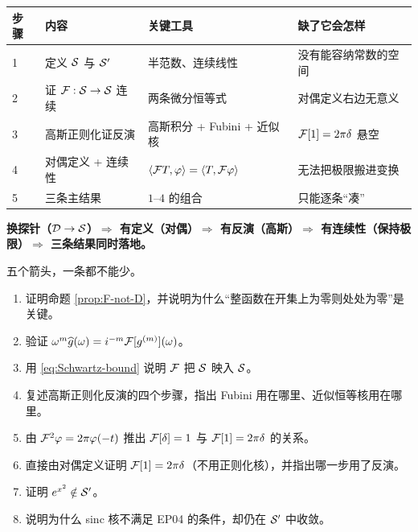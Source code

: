 \begin{center}
\small
\renewcommand{\arraystretch}{1.42}
\begin{tabularx}{\textwidth}{@{}L{1.0cm}L{4.6cm}L{4.4cm}Y@{}}
\toprule
步骤 & 内容 & 关键工具 & 缺了它会怎样 \\
 & 定义 $\mathcal{S}$ 与 $\mathcal{S}'$ & 半范数、连续线性 & 没有能容纳常数的空间 \\
2 & 证 $\mathcal{F}:\mathcal{S}\to\mathcal{S}$ 连续 & 两条微分恒等式 & 对偶定义右边无意义 \\
3 & 高斯正则化证反演 & 高斯积分 + Fubini + 近似核 & $\mathcal{F}[1]=2\pi\delta$ 悬空 \\
4 & 对偶定义 + 连续性 & $\langle \mathcal{F} T,\varphi\rangle=\langle T,\mathcal{F}\varphi\rangle$ & 无法把极限搬进变换 \\
5 & 三条主结果 & $1$--$4$ 的组合 & 只能逐条“凑” \\
\bottomrule
\end{tabularx}
\end{center}

\begin{notebox}[一句话总结这一集的技术路线]
\textbf{换探针（$\mathcal{D}\to\mathcal{S}$）$\Rightarrow$ 有定义（对偶）$\Rightarrow$ 有反演（高斯）$\Rightarrow$ 有连续性（保持极限）$\Rightarrow$ 三条结果同时落地。}

五个箭头，一条都不能少。
\end{notebox}

\begin{quizbox}[EP06 自测]
\begin{enumerate}[leftmargin=1.6em,itemsep=0.35em]
\item 证明命题 \ref{prop:F-not-D}，并说明为什么“整函数在开集上为零则处处为零”是关键。
\item 验证 $\omega^{m}\widehat{g}(\omega)=i^{-m}\mathcal{F}[g^{(m)}](\omega)$。
\item 用 \eqref{eq:Schwartz-bound} 说明 $\mathcal{F}$ 把 $\mathcal{S}$ 映入 $\mathcal{S}$。
\item 复述高斯正则化反演的四个步骤，指出 Fubini 用在哪里、近似恒等核用在哪里。
\item 由 $\mathcal{F}^{2}\varphi=2\pi\varphi(-t)$ 推出 $\mathcal{F}[\delta]=1$ 与 $\mathcal{F}[1]=2\pi\delta$ 的关系。
\item 直接由对偶定义证明 $\mathcal{F}[1]=2\pi\delta$（不用正则化核），并指出哪一步用了反演。
\item 证明 $e^{x^{2}}\notin\mathcal{S}'$。
\item 说明为什么 sinc 核不满足 EP04 的条件，却仍在 $\mathcal{S}'$ 中收敛。
\end{enumerate}
\end{quizbox}

